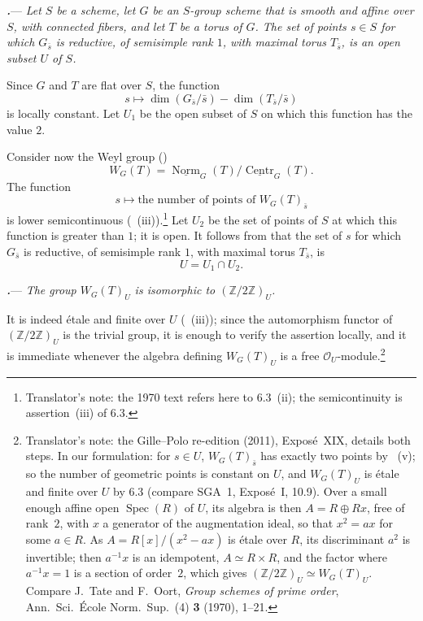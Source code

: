 \par\medskip\noindent
{}\textbf{\textit{.}}---
\textit{Let \(S\) be a scheme, let \(G\) be an \(S\)-group scheme that
is smooth and affine over \(S\), with connected fibers, and let \(T\)
be a torus of \(G\).  The set of points \(s\in S\) for which
\(G_{\bar s}\) is reductive, of semisimple rank \(1\), with maximal
torus \(T_{\bar s}\), is an open subset \(U\) of \(S\).}

Since \(G\) and \(T\) are flat over \(S\), the function
\[
  s
  \longmapsto
  \dim(G_{\bar s}/\bar s)-\dim(T_{\bar s}/\bar s)
\]
is locally constant.  Let \(U_1\) be the open subset of \(S\) on which
this function has the value \(2\).

Consider now the Weyl group \textup{()}
\[
  W_G(T)
  =
  \underline{\operatorname{Norm}}_{G}(T)/
  \underline{\operatorname{Centr}}_{G}(T).
\]
The function
\[
  s\longmapsto
  \text{the number of points of \(W_G(T)_{\bar s}\)}
\]
is lower semicontinuous \textup{(~(iii))}.\footnote{Translator's note: the 1970 text refers here to
6.3~(ii); the semicontinuity is assertion~(iii) of 6.3.}  Let \(U_2\) be the set of points
of \(S\) at which this function is greater than \(1\); it is open.  It
follows from  that the set of \(s\) for which \(G_{\bar s}\) is
reductive, of semisimple rank \(1\), with maximal torus \(T_{\bar s}\), is
\[
  U=U_1\cap U_2.
\]

\par\medskip\noindent
{}\textbf{\textit{.}}---
\textit{The group \(W_G(T)_U\) is isomorphic to
\((\mathbb Z/2\mathbb Z)_U\).}

It is indeed étale and finite over \(U\)
\textup{(~(iii))}; since the automorphism functor of
\((\mathbb Z/2\mathbb Z)_U\) is the trivial group, it is enough to
verify the assertion locally, and it is immediate whenever the algebra
defining \(W_G(T)_U\) is a free \(\mathcal O_U\)-module.\footnote{Translator's note: the Gille--Polo re-edition (2011), Exposé~XIX, details
both steps. In our formulation: for \(s\in U\), \(W_G(T)_{\bar s}\) has exactly
two points by ~(v); so the number of geometric points is constant on
\(U\), and \(W_G(T)_U\) is étale and finite over \(U\) by 6.3 (compare SGA~1,
Exposé~I, 10.9). Over a small enough affine open \(\operatorname{Spec}(R)\) of
\(U\), its algebra is then \(A=R\oplus Rx\), free of rank~\(2\), with \(x\) a
generator of the augmentation ideal, so that \(x^2=ax\) for some \(a\in R\). As
\(A=R[x]/(x^2-ax)\) is étale over \(R\), its discriminant \(a^2\) is
invertible; then \(a^{-1}x\) is an idempotent, \(A\simeq R\times R\), and the
factor where \(a^{-1}x=1\) is a section of order~\(2\), which gives
\((\mathbb Z/2\mathbb Z)_U\simeq W_G(T)_U\). Compare J.~Tate and F.~Oort,
\textit{Group schemes of prime order}, Ann.\ Sci.\ École Norm.\ Sup.\ (4)
\textbf{3} (1970), 1--21.}

